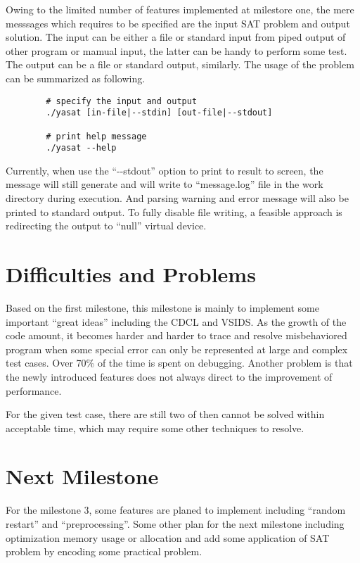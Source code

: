 \documentclass[a4paper, 11.5pt]{article}
\begin{document}
\begin{multicols}{2}
    Owing to the limited number of features implemented at milestore one, the mere messsages
    which requires to be specified are the input SAT problem and output solution. The input can be 
    either a file or standard input from piped output of other program or mamual input, the latter can 
    be handy to perform some test. The output can be a file or standard output, similarly. The usage of the problem can be summarized as following.
    \\

    \begin{tcolorbox}[breakable, blanker, width=\linewidth]
      \begin{verbatim}
        # specify the input and output
        ./yasat [in-file|--stdin] [out-file|--stdout]

        # print help message
        ./yasat --help
      \end{verbatim}
    \end{tcolorbox}

    Currently, when use the ``-\--stdout'' option to print to result to screen, the message will still generate and will write to ``message.log'' file in the work directory during execution. 
    And parsing warning and error message will also be printed to standard output. To fully disable file writing, a feasible approach is 
    redirecting the output to ``null'' virtual device.

  \section{Difficulties and Problems}

  Based on the first milestone, this milestone is mainly to implement some important ``great ideas'' including the CDCL and VSIDS.
  As the growth of the code amount, it becomes harder and harder to trace and resolve misbehaviored program when some special 
  error can only be represented at large and complex test cases. Over 70\% of the time is spent on debugging. Another problem is 
  that the newly introduced features does not always direct to the improvement of performance. 

  For the given test case, there are still two of then cannot be solved within acceptable time, which may require some other techniques to resolve.
  

  \section{Next Milestone}

  For the milestone 3, some features are planed to implement including ``random restart'' and ``preprocessing''.
  Some other plan for the next milestone including optimization memory usage or allocation and add some application of SAT problem by encoding some practical problem.

  \end{multicols}
\end{document}
